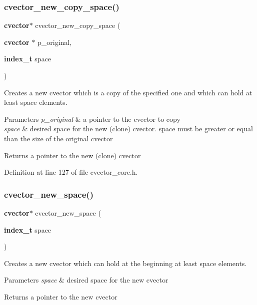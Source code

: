 \subsubsection{cvector\+\_\+new\+\_\+copy\+\_\+space()}
{\footnotesize\ttfamily \textbf{ cvector}$\ast$ cvector\+\_\+new\+\_\+copy\+\_\+space (\begin{DoxyParamCaption}\item[{\textbf{ cvector} $\ast$}]{p\+\_\+original,  }\item[{\textbf{ index\+\_\+t}}]{space }\end{DoxyParamCaption})}

Creates a new cvector which is a copy of the specified one and which can hold at least space elements. 
\begin{DoxyParams}{Parameters}
{\em p\+\_\+original} & a pointer to the cvector to copy \\
\hline
{\em space} & desired space for the new (clone) cvector. space must be greater or equal than the size of the original cvector \\
\hline
\end{DoxyParams}
\begin{DoxyReturn}{Returns}
a pointer to the new (clone) cvector 
\end{DoxyReturn}


Definition at line 127 of file cvector\+\_\+core.\+h.

\mbox{\label{cvector__core_8h_abc0d094d5cdbd31fc74f3902fd74a690}} 
\subsubsection{cvector\+\_\+new\+\_\+space()}
{\footnotesize\ttfamily \textbf{ cvector}$\ast$ cvector\+\_\+new\+\_\+space (\begin{DoxyParamCaption}\item[{\textbf{ index\+\_\+t}}]{space }\end{DoxyParamCaption})}

Creates a new cvector which can hold at the beginning at least space elements. 
\begin{DoxyParams}{Parameters}
{\em space} & desired space for the new cvector \\
\hline
\end{DoxyParams}
\begin{DoxyReturn}{Returns}
a pointer to the new cvector 
\end{DoxyReturn}


